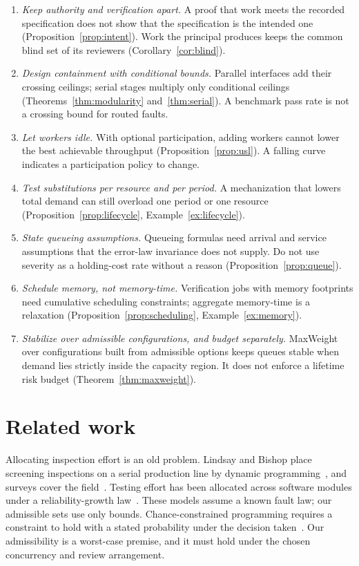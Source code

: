 \documentclass[11pt]{article}
\theoremstyle{definition}
\theoremstyle{remark}
\begin{document}
\begin{enumerate}[leftmargin=*,itemsep=3pt]
\item \emph{Keep authority and verification apart.} A proof that work meets the recorded
specification does not show that the specification is the intended one
(Proposition~\ref{prop:intent}). Work the principal produces keeps the common blind set of its
reviewers (Corollary~\ref{cor:blind}).
\item \emph{Design containment with conditional bounds.} Parallel interfaces add their crossing
ceilings; serial stages multiply only conditional ceilings (Theorems~\ref{thm:modularity}
and~\ref{thm:serial}). A benchmark pass rate is not a crossing bound for routed faults.
\item \emph{Let workers idle.} With optional participation, adding workers cannot lower the best
achievable throughput (Proposition~\ref{prop:usl}). A falling curve indicates a participation policy
to change.
\item \emph{Test substitutions per resource and per period.} A mechanization that lowers total demand
can still overload one period or one resource (Proposition~\ref{prop:lifecycle},
Example~\ref{ex:lifecycle}).
\item \emph{State queueing assumptions.} Queueing formulas need arrival and service assumptions that
the error-law invariance does not supply. Do not use severity as a holding-cost rate without a reason
(Proposition~\ref{prop:queue}).
\item \emph{Schedule memory, not memory-time.} Verification jobs with memory footprints need
cumulative scheduling constraints; aggregate memory-time is a relaxation
(Proposition~\ref{prop:scheduling}, Example~\ref{ex:memory}).
\item \emph{Stabilize over admissible configurations, and budget separately.} MaxWeight over
configurations built from admissible options keeps queues stable when demand lies strictly inside the
capacity region. It does not enforce a lifetime risk budget (Theorem~\ref{thm:maxweight}).
\end{enumerate}

\section{Related work}\label{sec:related}
Allocating inspection effort is an old problem. Lindsay and Bishop place screening inspections on a
serial production line by dynamic programming~\cite{lindsay64}, and surveys cover the
field~\cite{raz86,mandroli06}. Testing effort has been allocated across software modules under a
reliability-growth law~\cite{ohtera90}. These models assume a known fault law; our admissible sets use
only bounds. Chance-constrained programming requires a constraint to hold with a stated probability
under the decision taken~\cite{charnes59}. Our admissibility is a worst-case premise, and it must hold
under the chosen concurrency and review arrangement.
\end{document}
